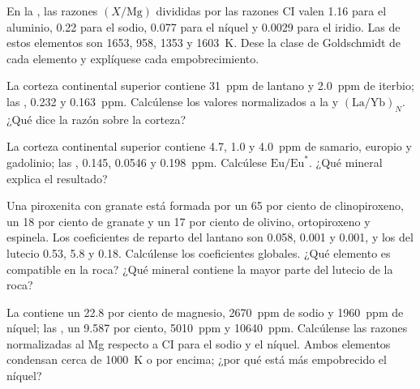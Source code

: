 \begin{exercise}[$\star$]\label{exo:b2:elements-in-the-earth:2}
En la , las razones $(X/\mathrm{Mg})$ divididas por las razones CI
valen 1.16 para el aluminio, 0.22 para el sodio, 0.077 para el níquel y 0.0029 para el
iridio. Las  de estos elementos son 1653, 958, 1353
y \qty{1603}{K}. Dese la clase de Goldschmidt de cada elemento y explíquese cada
empobrecimiento.
\end{exercise}

\begin{exercise}[$\star$]\label{exo:b2:elements-in-the-earth:3}
La corteza continental superior contiene \qty{31}{ppm} de lantano y \qty{2.0}{ppm}
de iterbio; las , 0.232 y \qty{0.163}{ppm}. Calcúlense los
valores normalizados a la  y $(\mathrm{La}/\mathrm{Yb})_N$. ¿Qué dice la
razón sobre la corteza?
\end{exercise}

\begin{exercise}[$\star$]\label{exo:b2:elements-in-the-earth:4}
La corteza continental superior contiene 4.7, 1.0 y \qty{4.0}{ppm} de samario,
europio y gadolinio; las , 0.145, 0.0546 y \qty{0.198}{ppm}.
Calcúlese $\mathrm{Eu}/\mathrm{Eu}^*$. ¿Qué mineral explica el resultado?
\end{exercise}

\begin{exercise}[$\star\star$]\label{exo:b2:elements-in-the-earth:5}
Una piroxenita con granate está formada por un 65 por ciento de clinopiroxeno, un 18 por ciento de granate y
un 17 por ciento de olivino, ortopiroxeno y espinela. Los coeficientes de reparto del
lantano son 0.058, 0.001 y 0.001, y los del lutecio 0.53, 5.8 y 0.18.
Calcúlense los coeficientes globales. ¿Qué elemento es compatible en la roca? ¿Qué
mineral contiene la mayor parte del lutecio de la roca?
\end{exercise}

\begin{exercise}[$\star\star$]\label{exo:b2:elements-in-the-earth:6}
La  contiene un 22.8 por ciento de magnesio, \qty{2670}{ppm} de
sodio y \qty{1960}{ppm} de níquel; las , un 9.587 por ciento,
\qty{5010}{ppm} y \qty{10640}{ppm}. Calcúlense las razones normalizadas al Mg respecto a CI para
el sodio y el níquel. Ambos elementos condensan cerca de \qty{1000}{K} o por encima; ¿por qué está
más empobrecido el níquel?
\end{exercise}

